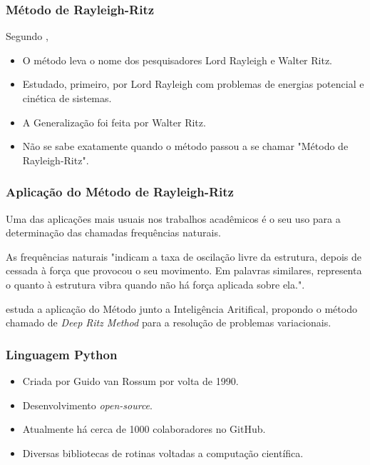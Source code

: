 \documentclass{beamer}
\begin{document}
	\begin{frame}
		\frametitle{Método de Rayleigh-Ritz}
		\justify
		
		Segundo , 
		\begin{itemize}
			\justifying
			\item O método leva o nome dos pesquisadores Lord Rayleigh e Walter Ritz.
			\pause
			\item Estudado, primeiro, por Lord Rayleigh com problemas de energias potencial e cinética de sistemas.
			\pause
			\item A Generalização foi feita por Walter Ritz.
			\pause
			\item Não se sabe exatamente quando o método passou a se chamar "Método de Rayleigh-Ritz".
		\end{itemize}
	\end{frame}
	
	\begin{frame}
		\frametitle{Aplicação do Método de Rayleigh-Ritz}
		\justify

		Uma das aplicações mais usuais nos trabalhos acadêmicos é o seu uso para a determinação das chamadas frequências naturais.
		\vspace{10pt}
		\pause
		
		As frequências naturais "indicam a taxa de oscilação livre da estrutura, depois de cessada à força que provocou o seu movimento. Em palavras similares, representa o quanto à estrutura vibra quando não há força aplicada sobre ela."\text{ }\cite[p. 1]{Vasquez2015}.
		\vspace{10pt}
		\pause
		
		 estuda a aplicação do Método junto a Inteligência Aritifical, propondo o método chamado de \textit{Deep Ritz Method} para a resolução de problemas variacionais.
	\end{frame}
	
	\begin{frame}
		\frametitle{Linguagem Python}
		\justify
		
		\begin{itemize}
			\justifying
			\item Criada por Guido van Rossum por volta de 1990.
			\pause
			\item Desenvolvimento \textit{open-source}.
			\pause
			\item Atualmente há cerca de 1000 colaboradores no GitHub.
			\pause
			\item Diversas bibliotecas de rotinas voltadas a computação científica.
		\end{itemize}
	\end{frame}
\end{document}
